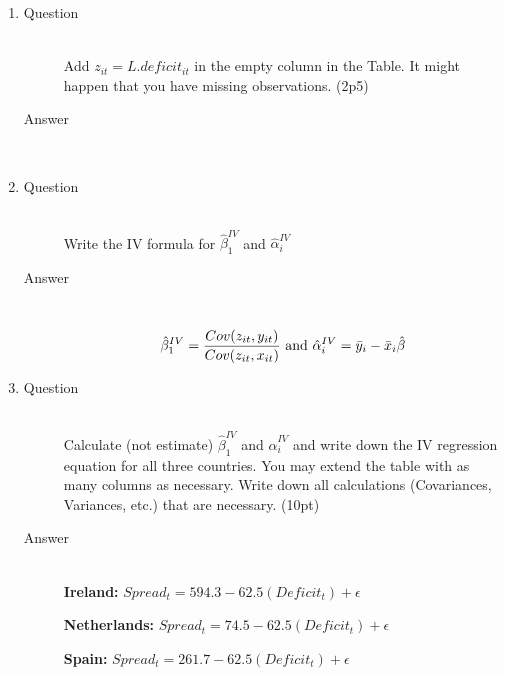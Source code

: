 \documentclass{article}
\begin{document}
\begin{enumerate}
\begin{description}
  \end{description}
  
  \item
  \begin{description}
    \item[Question] \hfill \\
    Add \(z_{it} = L.deficit_{it} \) in the empty column in the Table. It might happen that you have missing observations. (2p5)
    \item[Answer] \hfill \\
    
  \end{description}
  
  \item
  \begin{description}
    \item[Question] \hfill \\
    Write the IV formula for \(\hat{\beta}^{IV}_1\) and \(\hat{\alpha}^{IV}_i\)
    \item[Answer] \hfill \\
    
    \[ \hat{\beta}^{IV}_1 = \frac{Cov(z_{it},y_{it})}{Cov(z_{it},x_{it})} \textnormal{ and } \hat{\alpha}^{IV}_i = \bar{y}_{i} - \bar{x}_{i}\hat{\beta} \]
    
  \end{description}
  
  \item
  \begin{description}
    \item[Question] \hfill \\
    Calculate (not estimate) \(\hat{\beta}^{IV}_1\) and \(\hat{\alpha}^{IV}_i\) and write down the IV regression equation for all three countries. You may extend the table with as many columns as necessary. Write down all calculations (Covariances, Variances, etc.) that are necessary. (10pt)
    \item[Answer] \hfill \\
    
    \textbf{Ireland:} \( Spread_{t} = 594.3 -62.5(Deficit_{t}) + \epsilon \)
    
    \textbf{Netherlands:} \( Spread_{t} = 74.5 -62.5(Deficit_{t}) + \epsilon \)
    
    \textbf{Spain:} \( Spread_{t} = 261.7 -62.5(Deficit_{t}) + \epsilon \)
    
  \end{description}
  
\end{enumerate}
\end{document}
